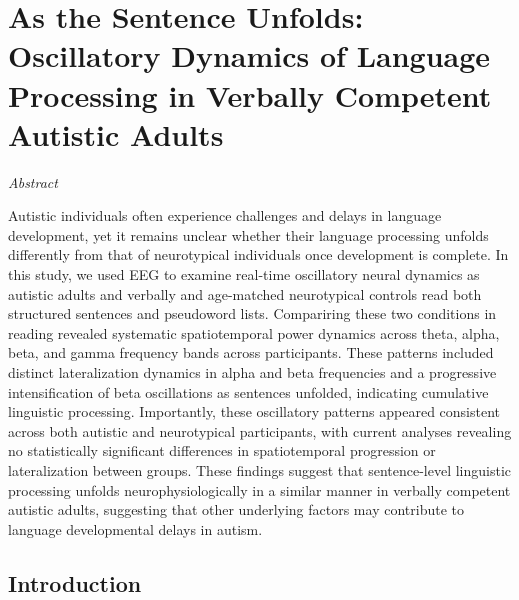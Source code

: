 \chapter{As the Sentence Unfolds: Oscillatory Dynamics of Language Processing in Verbally Competent Autistic Adults}
\label{ch:language_asc}

\vspace{-1cm}
\begin{center}
    \large\textit{Abstract}
\end{center} 

{\abstractfont 
Autistic individuals often experience challenges and delays in language development, yet it remains unclear whether their language processing unfolds differently from that of neurotypical individuals once development is complete. In this study, we used EEG to examine real-time oscillatory neural dynamics as autistic adults and verbally and age-matched neurotypical controls read both structured sentences and pseudoword lists. Compariring these two conditions in reading revealed systematic spatiotemporal power dynamics across theta, alpha, beta, and gamma frequency bands across participants. These patterns included distinct lateralization dynamics in alpha and beta frequencies and a progressive intensification of beta oscillations as sentences unfolded, indicating cumulative linguistic processing. Importantly, these oscillatory patterns appeared consistent across both autistic and neurotypical participants, with current analyses revealing no statistically significant differences in spatiotemporal progression or lateralization between groups. These findings suggest that sentence-level linguistic processing unfolds neurophysiologically in a similar manner in verbally competent autistic adults, suggesting that other underlying factors may contribute to language developmental delays in autism.  
} 

\vspace{2cm}

\thispagestyle{empty}

\newpage

\section{Introduction}

